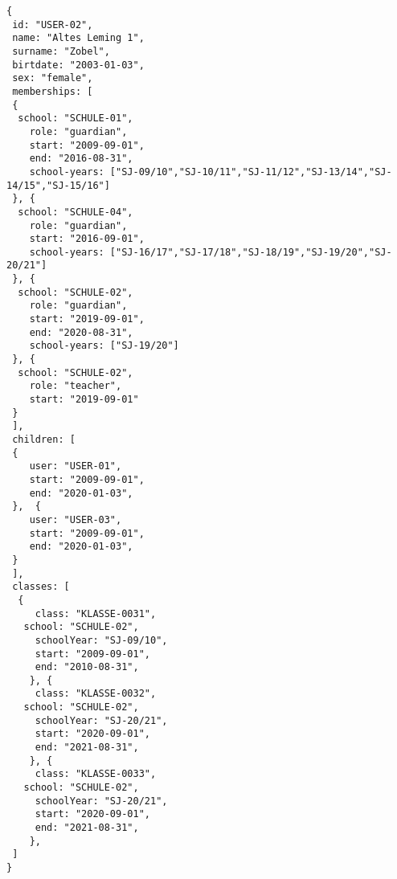 
\begin{lstlisting}[caption={Beispiel für Benutzer mit Rollen 'teacher' und 'guardian'},frame=tlrb]
{
 id: "USER-02",
 name: "Altes Leming 1",
 surname: "Zobel",
 birtdate: "2003-01-03",
 sex: "female",
 memberships: [
 {
  school: "SCHULE-01",
	role: "guardian",
	start: "2009-09-01",
	end: "2016-08-31",
	school-years: ["SJ-09/10","SJ-10/11","SJ-11/12","SJ-13/14","SJ-14/15","SJ-15/16"]
 }, {
  school: "SCHULE-04",
	role: "guardian",
	start: "2016-09-01",
	school-years: ["SJ-16/17","SJ-17/18","SJ-18/19","SJ-19/20","SJ-20/21"]
 }, {
  school: "SCHULE-02",
	role: "guardian",
	start: "2019-09-01",
	end: "2020-08-31",
	school-years: ["SJ-19/20"]
 }, {
  school: "SCHULE-02",
	role: "teacher",
	start: "2019-09-01"
 }
 ],
 children: [
 {
	user: "USER-01",
	start: "2009-09-01",
	end: "2020-01-03",
 },  {
	user: "USER-03",
	start: "2009-09-01",
	end: "2020-01-03",
 }
 ],
 classes: [
  {
	 class: "KLASSE-0031",
   school: "SCHULE-02",
	 schoolYear: "SJ-09/10",
	 start: "2009-09-01",
	 end: "2010-08-31",
	}, {
	 class: "KLASSE-0032",
   school: "SCHULE-02",
	 schoolYear: "SJ-20/21",
	 start: "2020-09-01",
	 end: "2021-08-31",
	}, {
	 class: "KLASSE-0033",
   school: "SCHULE-02",
	 schoolYear: "SJ-20/21",
	 start: "2020-09-01",
	 end: "2021-08-31",
	}, 
 ]
}
\end{lstlisting}
